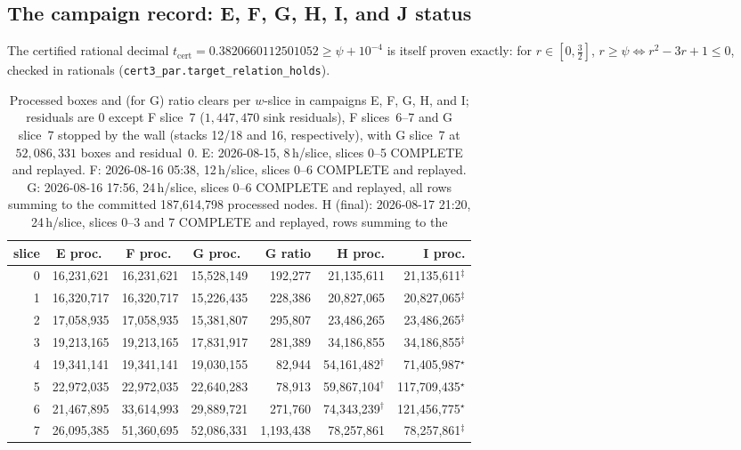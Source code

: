 \documentclass[11pt]{article}
\theoremstyle{plain}
\theoremstyle{definition}
\theoremstyle{remark}
\begin{document}
\subsection{The campaign record: E, F, G, H, I, and J status}
\label{sec:record}
The certified rational decimal
$t_{\mathrm{cert}}=0.3820660112501052\ge\psi+10^{-4}$ is itself proven
exactly: for $r\in[0,\tfrac32]$, $r\ge\psi\iff r^2-3r+1\le0$, checked
in rationals (\texttt{cert3\_par.target\_relation\_holds}).

\begin{table}[htbp]
\centering
\footnotesize
\setlength{\tabcolsep}{5.8pt}
\begin{tabular}{r r r r r r r}
\hline
slice & E proc.\ & F proc.\ & G proc.\ & G ratio & H proc. & I proc.\\
\hline
0 & 16,231,621 & 16,231,621 & 15,528,149 & 192,277 & 21,135,611 & 21,135,611$^{\ddagger}$\\
1 & 16,320,717 & 16,320,717 & 15,226,435 & 228,386 & 20,827,065 & 20,827,065$^{\ddagger}$\\
2 & 17,058,935 & 17,058,935 & 15,381,807 & 295,807 & 23,486,265 & 23,486,265$^{\ddagger}$\\
3 & 19,213,165 & 19,213,165 & 17,831,917 & 281,389 & 34,186,855 & 34,186,855$^{\ddagger}$\\
4 & 19,341,141 & 19,341,141 & 19,030,155 & 82,944 & 54,161,482$^{\dagger}$ & 71,405,987$^{\star}$\\
5 & 22,972,035 & 22,972,035 & 22,640,283 & 78,913 & 59,867,104$^{\dagger}$ & 117,709,435$^{\star}$\\
6 & 21,467,895 & 33,614,993 & 29,889,721 & 271,760 & 74,343,239$^{\dagger}$ & 121,456,775$^{\star}$\\
7 & 26,095,385 & 51,360,695 & 52,086,331 & 1,193,438 & 78,257,861 & 78,257,861$^{\ddagger}$\\
\hline
\end{tabular}
\caption{Processed boxes and (for G) ratio clears per $w$-slice in campaigns
E, F, G, H, and I; residuals are $0$ except F slice~7 ($1{,}447{,}470$ sink
residuals), F slices~6--7 and G slice~7 stopped by the wall (stacks 12/18
and 16, respectively), with G slice~7 at $52{,}086{,}331$ boxes and residual~0.
E: 2026-08-15,
8\,h/slice, slices 0--5 COMPLETE and replayed. F: 2026-08-16 05:38,
12\,h/slice, slices 0--6 COMPLETE and replayed. G: 2026-08-16 17:56,
24\,h/slice, slices 0--6 COMPLETE and replayed, all rows summing to the
committed 187{,}614{,}798 processed nodes. H (final): 2026-08-17 21:20,
24\,h/slice, slices 0--3 and 7 COMPLETE and replayed, rows summing to the
}
\end{table}
\end{document}
